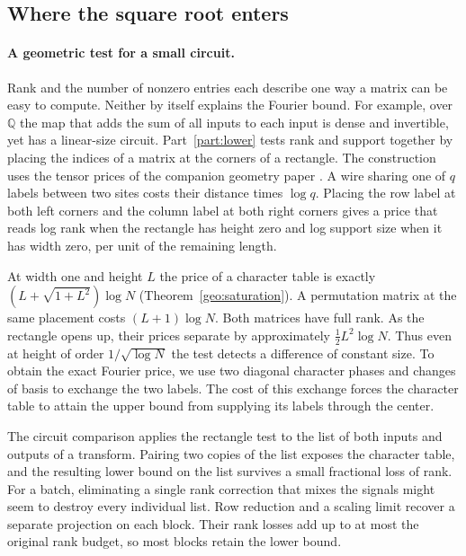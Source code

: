 

\subsection{Where the square root enters}

\paragraph{A geometric test for a small circuit.}
Rank and the number of nonzero entries each describe one way a matrix
can be easy to compute. Neither by itself explains the Fourier bound.
For example, over $\mathbb Q$ the map that adds the sum of all inputs
to each input is dense and invertible, yet has a linear-size circuit.
Part~\ref{part:lower} tests rank and support together by placing the
indices of a matrix at the corners of a rectangle. The construction
uses the tensor prices of the companion geometry paper \cite{oaG}.
A wire sharing one of $q$ labels between two sites costs their
distance times $\log q$. Placing the row label at both left corners
and the column label at both right corners gives a price that reads
log rank when the rectangle has height zero and log support size when
it has width zero, per unit of the remaining length.

At width one and height $L$ the price of a character table is exactly
$(L+\sqrt{1+L^2})\log N$ (Theorem~\ref{geo:saturation}). A
permutation matrix at the same placement costs $(L+1)\log N$. Both
matrices have full rank. As the rectangle opens up, their prices
separate by approximately $\tfrac12 L^2\log N$. Thus even at height
of order $1/\sqrt{\log N}$ the test detects a difference of constant
size. To obtain the exact Fourier price, we use two diagonal
character phases and changes of basis to exchange the two labels.
The cost of this exchange forces the character table to attain the
upper bound from supplying its labels through the center.

The circuit comparison applies the rectangle test to the list of both
inputs and outputs of a transform. Pairing two copies of the list
exposes the character table, and the resulting lower bound on the
list survives a small fractional loss of rank. For a batch, eliminating
a single rank correction that mixes the signals might seem to destroy
every individual list. Row reduction and a scaling limit recover a
separate projection on each block. Their rank losses add up to at
most the original rank budget, so most blocks retain the lower bound.

